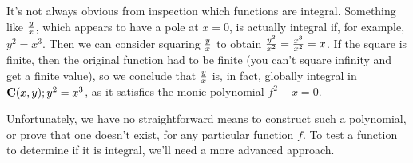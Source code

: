 It's not always obvious from inspection which functions are integral.
Something like $y \over x$, which appears to have a pole at $x=0$, is
actually integral if, for example, $y^2=x^3$.  Then we can consider
squaring $y \over x$ to obtain ${y^2 \over x^2} = {x^3 \over x^2} =
x$.  If the square is finite, then the original function had to be
finite (you can't square infinity and get a finite value), so we
conclude that $y \over x$ is, in fact, globally integral in ${\bf
C}(x,y); y^2=x^3$, as it satisfies the monic polynomial $f^2 - x = 0$.

Unfortunately, we have no straightforward means to construct such a
polynomial, or prove that one doesn't exist, for any particular
function $f$.  To test a function to determine if it is integral,
we'll need a more advanced approach.

%
%
%
%
%
%
%
%
%
%
%
%
%
